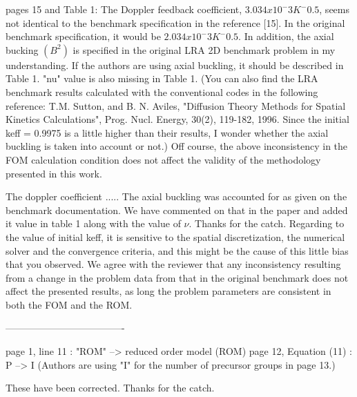 \documentclass[10pt]{article}
\begin{document}
\begin{response}
{ pages 15 and Table 1:
	The Doppler feedback coefficient, $3.034x10^-3 K^-0.5$, seems not identical to the benchmark specification in the reference [15]. In the original benchmark specification, it would be $2.034x10^-3 K^-0.5$.
	In addition, the axial bucking $(B^2)$ is specified in the original LRA 2D benchmark problem in my understanding. If the authors are using axial buckling, it should be described in Table 1. "nu" value is also missing in Table 1.
	(You can also find the LRA benchmark results calculated with the conventional codes in the following reference:
	T.M. Sutton, and B. N. Aviles, "Diffusion Theory Methods for Spatial Kinetics Calculations", Prog. Nucl. Energy, 30(2), 119-182, 1996.
	Since the initial keff = 0.9975 is a little higher than their results, I wonder whether the axial buckling is taken into account or not.)
	Off course, the above inconsistency in the FOM calculation condition does not affect the validity of the methodology presented in this work.}


The doppler coefficient .....
The axial buckling was accounted for as given on the benchmark documentation. We have commented on that in the paper and added it value in table 1 along with the value of $\nu$. Thanks for the catch.
Regarding to the value of initial keff, it is sensitive to the spatial discretization, the numerical solver and the convergence criteria, and this might be the cause of this little bias that you observed.
We agree with the reviewer that any inconsistency resulting from a change in the problem data from that in the original benchmark does not affect the presented results, as long the problem parameters are consistent in both the FOM and the ROM. 


-------------------------------------
\end{response}

\begin{response}
{
 page 1, line 11 : "ROM" --> reduced order model (ROM)
 page 12, Equation (11) : P --> I (Authors are using "I" for the number of precursor groups in page 13.)}

\end{response}
These have been corrected. Thanks for the catch.
\end{document}
